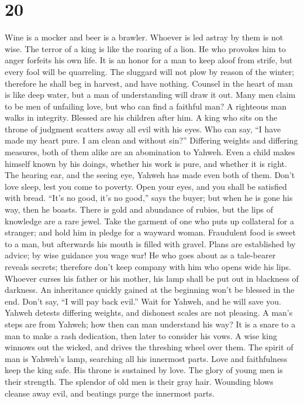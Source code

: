 \hypertarget{section-19}{%
\section{20}\label{section-19}}

 Wine is a mocker and beer is a brawler. Whoever is led
astray by them is not wise.  The terror of a king is like
the roaring of a lion. He who provokes him to anger forfeits his own
life.  It is an honor for a man to keep aloof from strife,
but every fool will be quarreling.  The sluggard will not
plow by reason of the winter; therefore he shall beg in harvest, and
have nothing.  Counsel in the heart of man is like deep
water, but a man of understanding will draw it out.  Many
men claim to be men of unfailing love, but who can find a faithful man?
 A righteous man walks in integrity. Blessed are his
children after him.  A king who sits on the throne of
judgment scatters away all evil with his eyes.  Who can
say, ``I have made my heart pure. I am clean and without sin?''
 Differing weights and differing measures, both of them
alike are an abomination to Yahweh.  Even a child makes
himself known by his doings, whether his work is pure, and whether it is
right.  The hearing ear, and the seeing eye, Yahweh has
made even both of them.  Don't love sleep, lest you come
to poverty. Open your eyes, and you shall be satisfied with bread.
 ``It's no good, it's no good,'' says the buyer; but when
he is gone his way, then he boasts.  There is gold and
abundance of rubies, but the lips of knowledge are a rare jewel.
 Take the garment of one who puts up collateral for a
stranger; and hold him in pledge for a wayward woman. 
Fraudulent food is sweet to a man, but afterwards his mouth is filled
with gravel.  Plans are established by advice; by wise
guidance you wage war!  He who goes about as a
tale-bearer reveals secrets; therefore don't keep company with him who
opens wide his lips.  Whoever curses his father or his
mother, his lamp shall be put out in blackness of darkness.
 An inheritance quickly gained at the beginning won't be
blessed in the end.  Don't say, ``I will pay back evil.''
Wait for Yahweh, and he will save you.  Yahweh detests
differing weights, and dishonest scales are not pleasing.
 A man's steps are from Yahweh; how then can man
understand his way?  It is a snare to a man to make a
rash dedication, then later to consider his vows.  A wise
king winnows out the wicked, and drives the threshing wheel over them.
 The spirit of man is Yahweh's lamp, searching all his
innermost parts.  Love and faithfulness keep the king
safe. His throne is sustained by love.  The glory of
young men is their strength. The splendor of old men is their gray hair.
 Wounding blows cleanse away evil, and beatings purge the
innermost parts.


